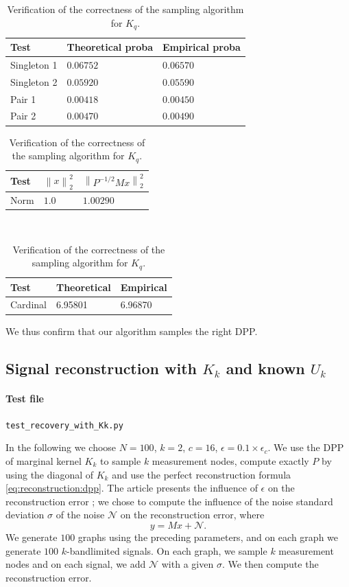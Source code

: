 \documentclass{article}
\newcommand{\norm}[1]{\left\|#1\right\|}
\begin{document}
\begin{table}[th]
  \caption{Verification of the correctness of the sampling algorithm for $K_q$.}
  \label{tab:Kq:verification}
  \centering
  \begin{tabular}{lll}
    \toprule
    Test &  Theoretical proba & Empirical proba \\
    \midrule
    Singleton 1 & $0.06752$ & $0.06570$ \\
    Singleton 2 & $0.05920$ & $0.05590$ \\
    Pair 1 & $0.00418$ & $0.00450$ \\
		Pair 2 & $0.00470$ & $0.00490$ \\
    \bottomrule
  \end{tabular}
	\quad
	\begin{tabular}{lll}
    \toprule
    Test &  $\norm{x}_2^2$ & $\norm{P^{-1/2} M x}_2^2$ \\
    \midrule
    Norm & $1.0$ & $1.00290$ \\
    \bottomrule
  \end{tabular} \\
	\vspace{0.5cm}
	\begin{tabular}{lll}
    \toprule
    Test &  Theoretical & Empirical \\
    \midrule
    Cardinal & 6.95801 & 6.96870 \\
    \bottomrule
  \end{tabular}
\end{table}
		

We thus confirm that our algorithm samples the right DPP.

\subsection[Signal reconstruction with Kk qnd known Uk]{Signal reconstruction with $K_k$ and known $U_k$}


\paragraph{Test file} \verb#test_recovery_with_Kk.py#


In the following we choose $N=100$, $k=2$, $c=16$, $\epsilon = 0.1 \times \epsilon_c$. We use the DPP of marginal kernel $K_k$ to sample $k$ measurement nodes, compute exactly $P$ by using the diagonal of $K_k$ and use the perfect reconstruction formula \eqref{eq:reconstruction:dpp}. The article presents the influence of $\epsilon$ on the reconstruction error ; we chose to compute the influence of the noise standard deviation $\sigma$ of the noise $\mathcal{N}$ on the reconstruction error, where
\[ y = Mx + \mathcal{N}. \] 
We generate $100$ graphs using the preceding parameters, and on each graph we generate $100$ $k$-bandlimited signals. On each graph, we sample $k$ measurement nodes and on each signal, we add $\mathcal{N}$ with a given $\sigma$. We then compute the reconstruction error.
\end{document}
